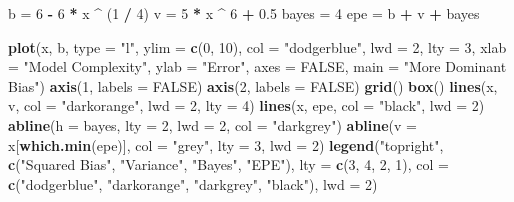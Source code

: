 \documentclass[]{report}
\newenvironment{Shaded}{\begin{snugshade}}{\end{snugshade}}
\newcommand{\KeywordTok}[1]{\textcolor[rgb]{0.13,0.29,0.53}{\textbf{#1}}}
\newcommand{\DataTypeTok}[1]{\textcolor[rgb]{0.13,0.29,0.53}{#1}}
\newcommand{\DecValTok}[1]{\textcolor[rgb]{0.00,0.00,0.81}{#1}}
\newcommand{\FloatTok}[1]{\textcolor[rgb]{0.00,0.00,0.81}{#1}}
\newcommand{\StringTok}[1]{\textcolor[rgb]{0.31,0.60,0.02}{#1}}
\newcommand{\OtherTok}[1]{\textcolor[rgb]{0.56,0.35,0.01}{#1}}
\newcommand{\OperatorTok}[1]{\textcolor[rgb]{0.81,0.36,0.00}{\textbf{#1}}}
\newcommand{\NormalTok}[1]{#1}
\begin{document}
\begin{Shaded}
\begin{Highlighting}[]
\NormalTok{b =}\StringTok{ }\DecValTok{6} \OperatorTok{-}\StringTok{ }\DecValTok{6} \OperatorTok{*}\StringTok{ }\NormalTok{x }\OperatorTok{^}\StringTok{ }\NormalTok{(}\DecValTok{1} \OperatorTok{/}\StringTok{ }\DecValTok{4}\NormalTok{)}
\NormalTok{v =}\StringTok{ }\DecValTok{5} \OperatorTok{*}\StringTok{ }\NormalTok{x }\OperatorTok{^}\StringTok{ }\DecValTok{6} \OperatorTok{+}\StringTok{ }\FloatTok{0.5}
\NormalTok{bayes =}\StringTok{ }\DecValTok{4}
\NormalTok{epe =}\StringTok{ }\NormalTok{b }\OperatorTok{+}\StringTok{ }\NormalTok{v }\OperatorTok{+}\StringTok{ }\NormalTok{bayes}

\KeywordTok{plot}\NormalTok{(x, b, }\DataTypeTok{type =} \StringTok{"l"}\NormalTok{, }\DataTypeTok{ylim =} \KeywordTok{c}\NormalTok{(}\DecValTok{0}\NormalTok{, }\DecValTok{10}\NormalTok{), }\DataTypeTok{col =} \StringTok{"dodgerblue"}\NormalTok{, }\DataTypeTok{lwd =} \DecValTok{2}\NormalTok{, }\DataTypeTok{lty =} \DecValTok{3}\NormalTok{,}
     \DataTypeTok{xlab =} \StringTok{"Model Complexity"}\NormalTok{, }\DataTypeTok{ylab =} \StringTok{"Error"}\NormalTok{, }\DataTypeTok{axes =} \OtherTok{FALSE}\NormalTok{,}
     \DataTypeTok{main =} \StringTok{"More Dominant Bias"}\NormalTok{)}
\KeywordTok{axis}\NormalTok{(}\DecValTok{1}\NormalTok{, }\DataTypeTok{labels =} \OtherTok{FALSE}\NormalTok{)}
\KeywordTok{axis}\NormalTok{(}\DecValTok{2}\NormalTok{, }\DataTypeTok{labels =} \OtherTok{FALSE}\NormalTok{)}
\KeywordTok{grid}\NormalTok{()}
\KeywordTok{box}\NormalTok{()}
\KeywordTok{lines}\NormalTok{(x, v, }\DataTypeTok{col =} \StringTok{"darkorange"}\NormalTok{, }\DataTypeTok{lwd =} \DecValTok{2}\NormalTok{, }\DataTypeTok{lty =} \DecValTok{4}\NormalTok{)}
\KeywordTok{lines}\NormalTok{(x, epe, }\DataTypeTok{col =} \StringTok{"black"}\NormalTok{, }\DataTypeTok{lwd =} \DecValTok{2}\NormalTok{)}
\KeywordTok{abline}\NormalTok{(}\DataTypeTok{h =}\NormalTok{ bayes, }\DataTypeTok{lty =} \DecValTok{2}\NormalTok{, }\DataTypeTok{lwd =} \DecValTok{2}\NormalTok{, }\DataTypeTok{col =} \StringTok{"darkgrey"}\NormalTok{)}
\KeywordTok{abline}\NormalTok{(}\DataTypeTok{v =}\NormalTok{ x[}\KeywordTok{which.min}\NormalTok{(epe)], }\DataTypeTok{col =} \StringTok{"grey"}\NormalTok{, }\DataTypeTok{lty =} \DecValTok{3}\NormalTok{, }\DataTypeTok{lwd =} \DecValTok{2}\NormalTok{)}
\KeywordTok{legend}\NormalTok{(}\StringTok{"topright"}\NormalTok{, }\KeywordTok{c}\NormalTok{(}\StringTok{"Squared Bias"}\NormalTok{, }\StringTok{"Variance"}\NormalTok{, }\StringTok{"Bayes"}\NormalTok{, }\StringTok{"EPE"}\NormalTok{), }\DataTypeTok{lty =} \KeywordTok{c}\NormalTok{(}\DecValTok{3}\NormalTok{, }\DecValTok{4}\NormalTok{, }\DecValTok{2}\NormalTok{, }\DecValTok{1}\NormalTok{),}
       \DataTypeTok{col =} \KeywordTok{c}\NormalTok{(}\StringTok{"dodgerblue"}\NormalTok{, }\StringTok{"darkorange"}\NormalTok{, }\StringTok{"darkgrey"}\NormalTok{, }\StringTok{"black"}\NormalTok{), }\DataTypeTok{lwd =} \DecValTok{2}\NormalTok{)}
\end{Highlighting}
\end{Shaded}
\end{document}
